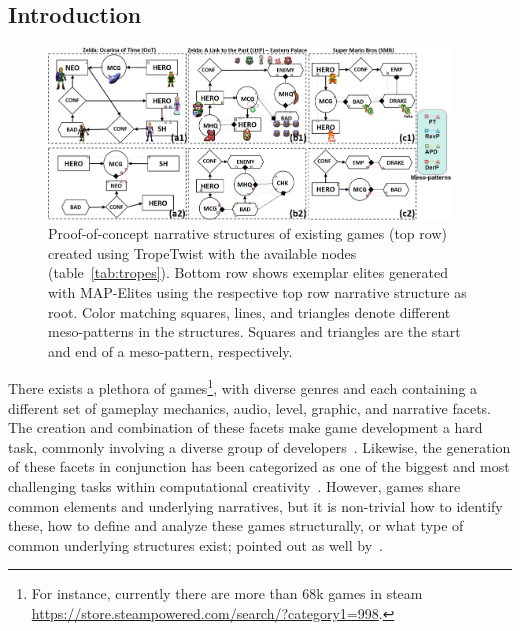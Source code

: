 \subsection{Introduction}

\begin{figure}
    \centering
    \includegraphics[width=0.95\textwidth]{figures/figure-1_extra8.png}
       \caption{Proof-of-concept narrative structures of existing games (top row) created using TropeTwist with the available nodes (table~\ref{tab:tropes}). Bottom row shows exemplar elites generated with MAP-Elites using the respective top row narrative structure as root. Color matching squares, lines, and triangles denote different meso-patterns in the structures. Squares and triangles are the start and end of a meso-pattern, respectively.}
       \label{fig:teaserfig}
\end{figure}

There exists a plethora of games\footnote{For instance, currently there are more than 68k games in steam \url{https://store.steampowered.com/search/?category1=998}.}, with diverse genres and each containing a different set of gameplay mechanics, audio, level, graphic, and narrative facets. The creation and combination of these facets make game development a hard task, commonly involving a diverse group of developers~\cite{p12Blow2004-gamesHard}. Likewise, the generation of these facets in conjunction has been categorized as one of the biggest and most challenging tasks within computational creativity~\cite{p12Liapis2014-gameCreativity,Liapis2019-OrchestratingGames}. However, games share common elements and underlying narratives, but it is non-trivial how to identify these, how to define and analyze these games structurally, or what type of common underlying structures exist; pointed out as well by~\cite{p12aarseth2018-ontologicalMeta,vozaru_game_2022}.

